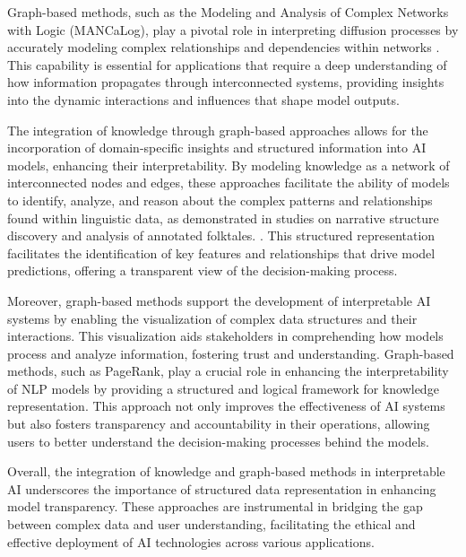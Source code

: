 Graph-based methods, such as the Modeling and Analysis of Complex Networks with Logic (MANCaLog), play a pivotal role in interpreting diffusion processes by accurately modeling complex relationships and dependencies within networks \cite{shakarian2022reasoningcomplexnetworkslogic}. This capability is essential for applications that require a deep understanding of how information propagates through interconnected systems, providing insights into the dynamic interactions and influences that shape model outputs.



The integration of knowledge through graph-based approaches allows for the incorporation of domain-specific insights and structured information into AI models, enhancing their interpretability. By modeling knowledge as a network of interconnected nodes and edges, these approaches facilitate the ability of models to identify, analyze, and reason about the complex patterns and relationships found within linguistic data, as demonstrated in studies on narrative structure discovery and analysis of annotated folktales. \cite{jannidis2016analyzingfeaturesdetectionhappy}. This structured representation facilitates the identification of key features and relationships that drive model predictions, offering a transparent view of the decision-making process.



Moreover, graph-based methods support the development of interpretable AI systems by enabling the visualization of complex data structures and their interactions. This visualization aids stakeholders in comprehending how models process and analyze information, fostering trust and understanding. Graph-based methods, such as PageRank, play a crucial role in enhancing the interpretability of NLP models by providing a structured and logical framework for knowledge representation. This approach not only improves the effectiveness of AI systems but also fosters transparency and accountability in their operations, allowing users to better understand the decision-making processes behind the models. \cite{altuncu2022improvingperformanceautomatickeyword,jannidis2016analyzingfeaturesdetectionhappy}



Overall, the integration of knowledge and graph-based methods in interpretable AI underscores the importance of structured data representation in enhancing model transparency. These approaches are instrumental in bridging the gap between complex data and user understanding, facilitating the ethical and effective deployment of AI technologies across various applications.

